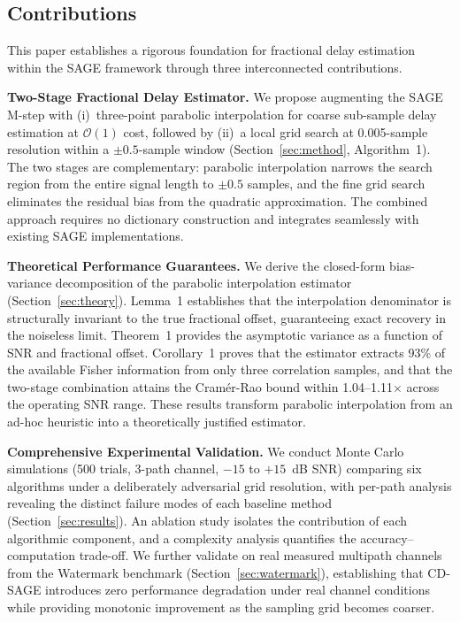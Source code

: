 \documentclass[a4paper,fleqn]{cas-dc}
\newcommand{\bigO}{\mathcal{O}}
\begin{document}
\subsection{Contributions}

This paper establishes a rigorous foundation for fractional delay estimation within the SAGE framework through three interconnected contributions.

\noindent\textbf{Two-Stage Fractional Delay Estimator.} We propose augmenting the SAGE M-step with (i)~three-point parabolic interpolation for coarse sub-sample delay estimation at $\bigO(1)$ cost, followed by (ii)~a local grid search at 0.005-sample resolution within a $\pm 0.5$-sample window (Section~\ref{sec:method}, Algorithm~1). The two stages are complementary: parabolic interpolation narrows the search region from the entire signal length to $\pm 0.5$ samples, and the fine grid search eliminates the residual bias from the quadratic approximation. The combined approach requires no dictionary construction and integrates seamlessly with existing SAGE implementations.

\noindent\textbf{Theoretical Performance Guarantees.} We derive the closed-form bias-variance decomposition of the parabolic interpolation estimator (Section~\ref{sec:theory}). Lemma~1 establishes that the interpolation denominator is structurally invariant to the true fractional offset, guaranteeing exact recovery in the noiseless limit. Theorem~1 provides the asymptotic variance as a function of SNR and fractional offset. Corollary~1 proves that the estimator extracts 93\% of the available Fisher information from only three correlation samples, and that the two-stage combination attains the Cram\'{e}r-Rao bound within 1.04--1.11$\times$ across the operating SNR range. These results transform parabolic interpolation from an ad-hoc heuristic into a theoretically justified estimator.

\noindent\textbf{Comprehensive Experimental Validation.} We conduct Monte Carlo simulations (500 trials, 3-path channel, $-15$ to $+15$~dB SNR) comparing six algorithms under a deliberately adversarial grid resolution, with per-path analysis revealing the distinct failure modes of each baseline method (Section~\ref{sec:results}). An ablation study isolates the contribution of each algorithmic component, and a complexity analysis quantifies the accuracy--computation trade-off. We further validate on real measured multipath channels from the Watermark benchmark (Section~\ref{sec:watermark}), establishing that CD-SAGE introduces zero performance degradation under real channel conditions while providing monotonic improvement as the sampling grid becomes coarser.
\end{document}
